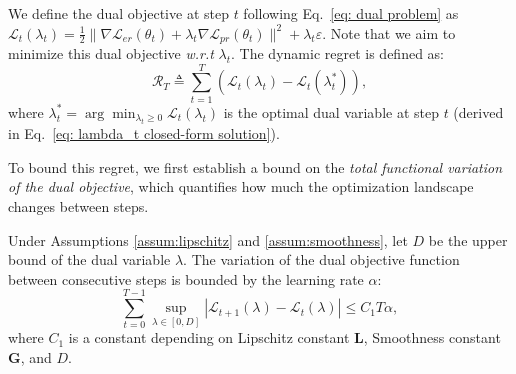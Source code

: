 We define the dual objective at step $t$ following Eq.~\ref{eq: dual problem} as $\mathcal{L}_t(\lambda_t) = \frac{1}{2}\|\nabla \mathcal{L}_{er}(\theta_t) + \lambda_t \nabla \mathcal{L}_{pr}(\theta_t)\|^2 + \lambda_t \varepsilon$. Note that we aim to minimize this dual objective \textit{w.r.t} $\lambda_t$.
The dynamic regret is defined as:
\begin{equation}
    \mathcal{R}_T \triangleq \sum_{t=1}^T \left( \mathcal{L}_t(\lambda_t) - \mathcal{L}_t(\lambda_t^*) \right),
\end{equation}
where $\lambda_t^* = \arg\min_{\lambda_t \ge 0} \mathcal{L}_t(\lambda_t)$ is the optimal dual variable at step $t$ (derived in Eq.~\ref{eq: lambda_t closed-form solution}).

To bound this regret, we first establish a bound on the \emph{total functional variation of the dual objective}, which quantifies how much the optimization landscape changes between steps.

\begin{lemma}
\label{lemma:func_variation}
Under Assumptions \ref{assum:lipschitz} and \ref{assum:smoothness}, let $D$ be the upper bound of the dual variable $\lambda$. The variation of the dual objective function between consecutive steps is bounded by the learning rate $\alpha$:
\begin{equation}
    \sum_{t=0}^{T-1} \sup_{\lambda \in [0, D]} | \mathcal{L}_{t+1}(\lambda) - \mathcal{L}_t(\lambda) | \le C_1 T \alpha,
\end{equation}
where $C_1$ is a constant depending on Lipschitz constant $\mathbf{L}$, Smoothness constant $\mathbf{G}$, and $D$.
\end{lemma}

